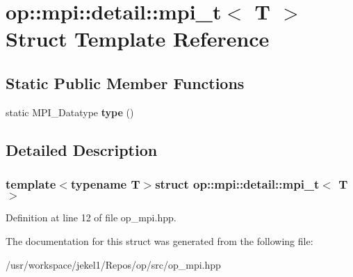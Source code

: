 \hypertarget{structop_1_1mpi_1_1detail_1_1mpi__t}{\section{op\-:\-:mpi\-:\-:detail\-:\-:mpi\-\_\-t$<$ T $>$ Struct Template Reference}
\label{structop_1_1mpi_1_1detail_1_1mpi__t}
}
\subsection*{Static Public Member Functions}
\begin{DoxyCompactItemize}
\item 
\hypertarget{structop_1_1mpi_1_1detail_1_1mpi__t_a0deba26f42782553da39503e7c0e741b}{static M\-P\-I\-\_\-\-Datatype {\bfseries type} ()}\label{structop_1_1mpi_1_1detail_1_1mpi__t_a0deba26f42782553da39503e7c0e741b}

\end{DoxyCompactItemize}


\subsection{Detailed Description}
\subsubsection*{template$<$typename T$>$struct op\-::mpi\-::detail\-::mpi\-\_\-t$<$ T $>$}



Definition at line 12 of file op\-\_\-mpi.\-hpp.



The documentation for this struct was generated from the following file\-:\begin{DoxyCompactItemize}
\item 
/usr/workspace/jekel1/\-Repos/op/src/op\-\_\-mpi.\-hpp\end{DoxyCompactItemize}
